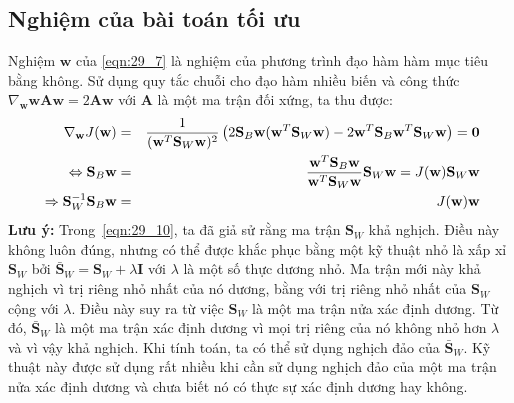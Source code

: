 \subsection{Nghiệm của bài toán tối ưu}
Nghiệm $\mathbf{w}$ của \eqref{eqn:29_7} là nghiệm của phương trình đạo hàm
hàm mục tiêu bằng không. Sử dụng quy tắc chuỗi cho đạo hàm  nhiều biến và công
thức $\nabla_{\mathbf{w}}\mathbf{w} \mathbf{A}\mathbf{w} = 2\mathbf{Aw}$ với
$\mathbf{A}$ là một ma trận đối xứng, ta thu được:
\begin{eqnarray}
\label{eqn:29_8}
\nabla_{\mathbf{w}} J(\mathbf{w}) &=& \frac{1}{(\mathbf{w}^T\mathbf{S}_{W}\mathbf{w})^2} \left(
2\mathbf{S}_B \mathbf{w} (\mathbf{w}^T\mathbf{S}_{W}\mathbf{w}) - 2\mathbf{w}^T\mathbf{S}_{B}\mathbf{w}^T\mathbf{S}_W \mathbf{w}
\right) = \mathbf{0}\\\
\label{eqn:29_9}
\Leftrightarrow \mathbf{S}_B\mathbf{w} &=& \frac{\mathbf{w}^T\mathbf{S}_B
\mathbf{w}}{\mathbf{w}^T\mathbf{S}_W\mathbf{w}}\mathbf{S}_W\mathbf{w} =
J(\mathbf{w})\mathbf{S}_W\mathbf{w}\\\
\label{eqn:29_10}
\Rightarrow \mathbf{S}_W^{-1}\mathbf{S}_B \mathbf{w} &=& J(\mathbf{w})\mathbf{w}
\end{eqnarray}
\textbf{Lưu ý:} Trong~\eqref{eqn:29_10}, ta đã giả sử rằng ma trận
$\mathbf{S}_W$ khả nghịch. Điều này không luôn đúng, nhưng có thể được khắc phục bằng một kỹ
thuật nhỏ là xấp xỉ $\mathbf{S}_W$ bởi $ \bar{\mathbf{S}}_W =
\mathbf{S}_W + \lambda\mathbf{I}$ với $\lambda$ là một số thực dương nhỏ. Ma
trận mới này khả nghịch vì trị riêng nhỏ nhất của nó dương, bằng với trị riêng nhỏ
nhất của $\mathbf{S}_W$ cộng với $\lambda$. Điều
này suy ra từ việc $\mathbf{S}_W$ là một ma trận nửa xác định dương. Từ đó,
$\bar{\mathbf{S}}_W$ là một ma trận xác định dương vì mọi trị riêng của nó không nhỏ hơn $\lambda$ và vì vậy khả nghịch. Khi tính toán, ta có thể sử
dụng nghịch đảo của $\bar{\mathbf{S}}_W$. Kỹ thuật này được sử dụng rất nhiều
khi cần sử dụng nghịch đảo của một ma trận nửa xác định dương và chưa biết nó có
thực sự xác định dương hay không.

